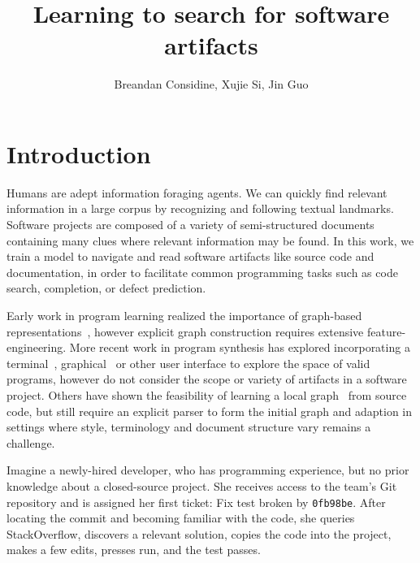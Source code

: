 \documentclass[11pt]{article}
\title{Learning to search for software artifacts}
\author{Breandan Considine, Xujie Si, Jin Guo}
\begin{document}
\maketitle

\section{Introduction}

Humans are adept information foraging agents. We can quickly find relevant information in a large corpus by recognizing and following textual landmarks. Software projects are composed of a variety of semi-structured documents containing many clues where relevant information may be found. In this work, we train a model to navigate and read software artifacts like source code and documentation, in order to facilitate common programming tasks such as code search, completion, or defect prediction.


Early work in program learning realized the importance of graph-based representations~\citep{allamanis2017learning}, however explicit graph construction requires extensive feature-engineering. More recent work in program synthesis has explored incorporating a terminal~\citep{ellis2019write}, graphical~\citep{walke2020learning} or other user interface to explore the space of valid programs, however do not consider the scope or variety of artifacts in a software project. Others have shown the feasibility of learning a local graph~\citep{johnson2020learning} from source code, but still require an explicit parser to form the initial graph and adaption in settings where style, terminology and document structure vary remains a challenge.


Imagine a newly-hired developer, who has programming experience, but no prior knowledge about a closed-source project. She receives access to the team's Git repository and is assigned her first ticket: Fix test broken by \texttt{0fb98be}. After locating the commit and becoming familiar with the code, she queries StackOverflow, discovers a relevant solution, copies the code into the project, makes a few edits, presses run, and the test passes.
\end{document}
